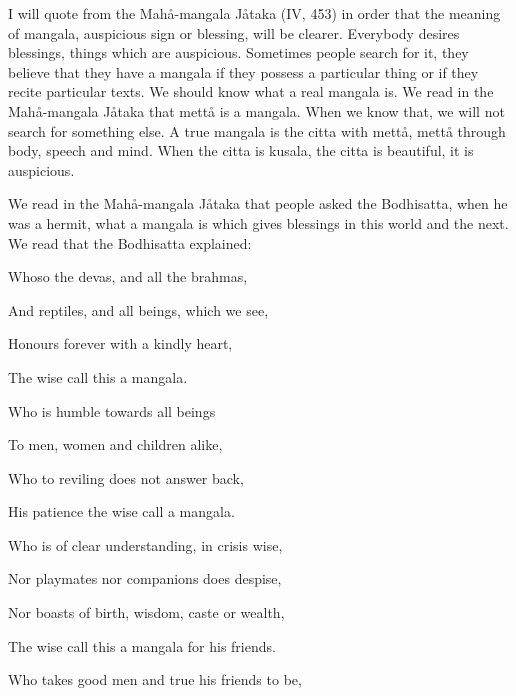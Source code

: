 \documentclass[12pt,twoside]{article}
\begin{document}
I will quote from the
{\textasciigrave}{\textasciigrave}Mah{\aa}{}-mangala
J{\aa}taka{\textquotesingle}{\textquotesingle} (IV, 453) in order that
the meaning of
{\textasciigrave}{\textasciigrave}mangala{\textquotesingle}{\textquotesingle},
auspicious sign or blessing, will be clearer. Everybody desires
blessings, things which are auspicious. Sometimes people search for it,
they believe that they have a mangala if they possess a particular
thing or if they recite particular texts. We should know what a real
mangala is. We read in the
{\textasciigrave}{\textasciigrave}Mah{\aa}{}-mangala
J{\aa}taka{\textquotesingle}{\textquotesingle} that mett{\aa} is a
mangala. When we know that, we will not search for something else. A
true mangala is the citta with mett{\aa}, mett{\aa} through body,
speech and mind. When the citta is kusala, the citta is beautiful, it
is
{\textasciigrave}{\textasciigrave}auspicious{\textquotesingle}{\textquotesingle}.


We read in the {\textasciigrave}{\textasciigrave}Mah{\aa}{}-mangala
J{\aa}taka{\textquotesingle}{\textquotesingle} that people asked the
Bodhisatta, when he was a hermit, what a mangala is which gives
blessings in this world and the next. We read that the Bodhisatta
explained:


\bigskip

Whoso the devas, and all the brahmas,

And reptiles, and all beings, which we see,

Honours forever with a kindly heart, 

The wise call this a mangala. 


\bigskip


\bigskip

Who is humble towards all beings

To men, women and children alike, 

Who to reviling does not answer back, 

His patience the wise call a mangala. 


\bigskip

Who is of clear understanding, in crisis wise,

Nor playmates nor companions does despise,

Nor boasts of birth, wisdom, caste or wealth, 

The wise call this a mangala for his friends. 


\bigskip

Who takes good men and true his friends to be, 
\end{document}
